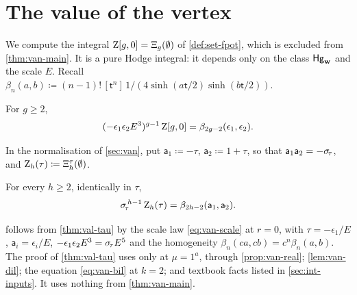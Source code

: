 \section{The value of the vertex}
\label{sec:val}

We compute the integral $\mathrm{Z}[g,0]=\Xi_g(\emptyset)$ of \cref{def:set-fpot}, which is excluded from \cref{thm:van-main}. It is a pure Hodge integral: it depends only on the class $\mathsf{Hg}_{\mathbf{w}}$ and the scale $E$. Recall $\beta_n(a,b)\coloneqq(n-1)!\,[\mathsf{t}^n]\,1/(4\sinh(a\mathsf{t}/2)\sinh(b\mathsf{t}/2))$.

\begin{thm}[{\Lg{Theorem~9.1}}]\label{thm:val-main}
For $g\geq 2$,
\[
(-\epsilon_1\epsilon_2E^3)^{g-1}\,\mathrm{Z}[g,0]=\beta_{2g-2}(\epsilon_1,\epsilon_2).
\]
\end{thm}

In the normalisation of \cref{sec:van}, put $\mathsf{a}_1\coloneqq-\tau$, $\mathsf{a}_2\coloneqq1+\tau$, so that $\mathsf{a}_1\mathsf{a}_2=-\sigma_{\!\tau}$, and $\mathrm{Z}_h(\tau)\coloneqq\Xi^{\tau}_h(\emptyset)$.

\begin{thm}[{\Lg{Theorem~9.3}}]\label{thm:val-tau}
For every $h\geq 2$, identically in $\tau$,
\[
\sigma_{\!\tau}^{\,h-1}\,\mathrm{Z}_h(\tau)=\beta_{2h-2}(\mathsf{a}_1,\mathsf{a}_2).
\]
\end{thm}

 follows from \cref{thm:val-tau} by the scale law \eqref{eq:van-scale} at $r=0$, with $\tau=-\epsilon_1/E$, $\mathsf{a}_i=\epsilon_i/E$, $-\epsilon_1\epsilon_2E^3=\sigma_{\!\tau} E^5$ and the homogeneity $\beta_n(ca,cb)=c^n\beta_n(a,b)$. The proof of \cref{thm:val-tau} uses \cite[eq.~(1)--(3)]{LLZ03} only at $\mu=1^a$, through \cref{prop:van-real}; \cref{lem:van-dil}; the equation \eqref{eq:van-bil} at $k=2$; and textbook facts listed in \cref{sec:int-inputs}. It uses nothing from \cref{thm:van-main}.

